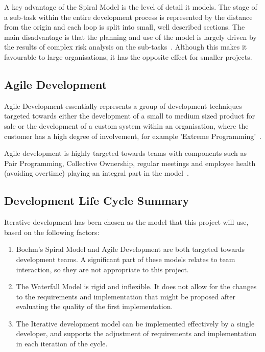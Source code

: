 \documentclass[authoryearcitations]{UoYCSproject}
\begin{document}
A key advantage of the Spiral Model is the level of detail it models.  The stage of a sub-task within the entire development process is represented by the distance from the origin and each loop is split into small, well described sections.  The main disadvantage is that the planning and use of the model is largely driven by the results of complex risk analysis on the sub-tasks~\cite{sommervilleSoftwareEngineering}.  Although this makes it favourable to large organisations, it has the opposite effect for smaller projects.

\subsection{Agile Development}
Agile Development essentially represents a group of development techniques targeted towards either the development of a small to medium sized product for sale or the development of a custom system within an organisation, where the customer has a high degree of involvement, for example 'Extreme Programming'~\cite{sommervilleSoftwareEngineering}.

Agile development is highly targeted towards teams with components such as Pair Programming, Collective Ownership, regular meetings and employee health (avoiding overtime) playing an integral part in the model~\cite{sommervilleSoftwareEngineering}.

\subsection{Development Life Cycle Summary}
\label{sec:developmentLifeCycleSummary}
Iterative development has been chosen as the model that this project will use, based on the following factors:
\begin{enumerate}
  \item Boehm's Spiral Model and Agile Development are both targeted towards development teams.  A significant part of these models relates to team interaction, so they are not appropriate to this project.
  \item The Waterfall Model is rigid and inflexible.  It does not allow for the changes to the requirements and implementation that might be proposed after evaluating the quality of the first implementation.
  \item The Iterative development model can be implemented effectively by a single developer, and supports the adjustment of requirements and implementation in each iteration of the cycle.
\end{enumerate}
\end{document}
